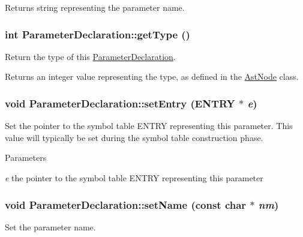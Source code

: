 \begin{DoxyReturn}{Returns}
string representing the parameter name. 
\end{DoxyReturn}
\hypertarget{classParameterDeclaration_a68cbaf66b6aa35c05fc30f236321829a}{
\subsubsection[{getType}]{\setlength{\rightskip}{0pt plus 5cm}int ParameterDeclaration::getType ()}}
\label{classParameterDeclaration_a68cbaf66b6aa35c05fc30f236321829a}
Return the type of this \hyperlink{classParameterDeclaration}{ParameterDeclaration}.

\begin{DoxyReturn}{Returns}
an integer value representing the type, as defined in the \hyperlink{classAstNode}{AstNode} class. 
\end{DoxyReturn}
\hypertarget{classParameterDeclaration_a8b07142bec67be6eccd2bdf3147fb5a2}{
\subsubsection[{setEntry}]{\setlength{\rightskip}{0pt plus 5cm}void ParameterDeclaration::setEntry (ENTRY $\ast$ {\em e})}}
\label{classParameterDeclaration_a8b07142bec67be6eccd2bdf3147fb5a2}
Set the pointer to the symbol table ENTRY representing this parameter. This value will typically be set during the symbol table construction phase.


\begin{DoxyParams}{Parameters}
\item[{\em e}]the pointer to the symbol table ENTRY representing this parameter \end{DoxyParams}
\hypertarget{classParameterDeclaration_a1883647c68399feaffb9531e27b85bb2}{
\subsubsection[{setName}]{\setlength{\rightskip}{0pt plus 5cm}void ParameterDeclaration::setName (const char $\ast$ {\em nm})}}
\label{classParameterDeclaration_a1883647c68399feaffb9531e27b85bb2}
Set the parameter name.


